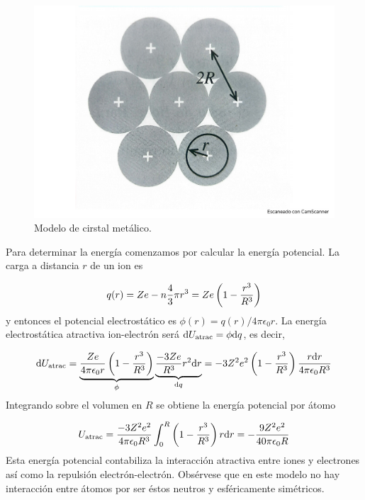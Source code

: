 \begin{figure}[h!] \centering
    \includegraphics[scale=0.4]{Cuerpo/Ch_03/Fotos libro 9.pdf}
    \caption{Modelo de cirstal metálico.}
    \label{Fig:03-10}
\end{figure}    


Para determinar la energía comenzamos por calcular la energía potencial. La carga a distancia $r$ de un ion es

\begin{equation}
    q(r) = Ze - n \frac{4}{3} \pi r^3 = Ze \left( 1-\frac{r ^3}{R^3} \right)
\end{equation}
y entonces el potencial electrostático es $\phi(r) = q(r)/4\pi \epsilon_0 r$. La energía electrostática atractiva ion-electrón será $\mathrm{d} U_{\text{atrac}} = \phi \mathrm{d} q$, es decir,

\begin{equation}
    \mathrm{d} U_{\text{atrac}} = \underbrace{\frac{Ze}{4 \pi \epsilon_0 r} \left( 1-\frac{r^3}{R^3} \right)}_{\phi} \underbrace{\frac{-3Ze}{R^3}r^2 \mathrm{d} r}_{\mathrm{d} q} = -3Z^2 e^2 \left( 1-\frac{r^3}{R^3} \right) \frac{r\mathrm{d} r}{4 \pi \epsilon_0 R^3}
\end{equation}
Integrando sobre el volumen en $R$ se obtiene la energía potencial por átomo

\begin{equation}
    U_{\text{atrac}} = \frac{-3Z^2e^2}{4 \pi \epsilon_0 R^3} \int_0^R \left( 1-\frac{r^3}{R^3} \right) r \mathrm{d} r = - \frac{9Z^2 e^2}{40 \pi \epsilon_0 R}
\end{equation}
Esta energía potencial contabiliza la interacción atractiva entre iones y electrones así como la repulsión electrón-electrón. Obsérvese que en este modelo no hay interacción entre átomos por ser éstos neutros y esféricamente simétricos. 

